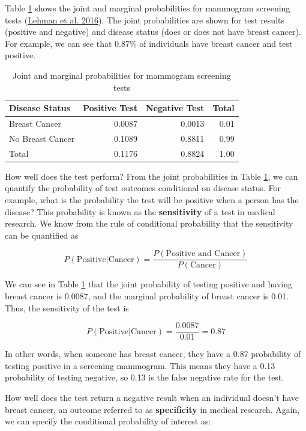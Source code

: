 \documentclass[
]{book}
\begin{document}
Table \ref{tab:c10t1} shows the joint and marginal probabilities for
mammogram screening tests (\href{https://pubs.rsna.org/doi/10.1148/radiol.2016161174}{Lehman et al.
2016}). The joint
probabilities are shown for test results (positive and negative) and
disease status (does or does not have breast cancer). For example, we
can see that 0.87\% of individuals have breast cancer and test positive.

\begin{table}
\centering
\caption{\label{tab:c10t1}Joint and marginal probabilities for mammogram screening tests}
\centering
\begin{tabular}[t]{l|r|r|r}
\hline
Disease Status & Positive Test & Negative Test & Total\\
\hline
Breast Cancer & 0.0087 & 0.0013 & 0.01\\
\hline
No Breast Cancer & 0.1089 & 0.8811 & 0.99\\
\hline
Total & 0.1176 & 0.8824 & 1.00\\
\hline
\end{tabular}
\end{table}

How well does the test perform? From the joint probabilities in Table
\ref{tab:c10t1}, we can quantify the probability of test outcomes
conditional on disease status. For example, what is the probability the
test will be positive when a person has the disease? This probability is
known as the \textbf{sensitivity} of a test in medical research. We know from
the rule of conditional probability that the sensitivity can be
quantified as

\[
P(\text{Positive}|\text{Cancer}) = \frac{P(\text{Positive and Cancer})}{P(\text{Cancer})}
\]

We can see in Table \ref{tab:c10t1} that the joint probability of
testing positive and having breast cancer is 0.0087, and the marginal
probability of breast cancer is 0.01. Thus, the sensitivity of the test
is

\[
P(\text{Positive}|\text{Cancer}) = \frac{0.0087}{0.01}=0.87
\]

In other words, when someone has breast cancer, they have a 0.87
probability of testing positive in a screening mammogram. This means
they have a 0.13 probability of testing negative, so 0.13 is the false
negative rate for the test.

How well does the test return a negative result when an individual
doesn't have breast cancer, an outcome referred to as \textbf{specificity} in
medical research. Again, we can specify the conditional probability of
interest as:
\end{document}
